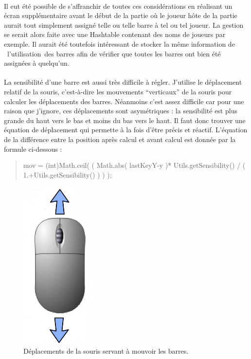\documentclass[a4paper,12pt]{report}
\begin{document}
\paragraph{}
Il eut été possible de s'affranchir de toutes ces considérations en réalisant un écran supplémentaire avant le début de la partie où le joueur hôte de la partie aurait tout simplement assigné telle ou telle barre à tel ou tel joueur. La gestion se serait alors faite avec une Hashtable contenant des noms de joueurs par exemple. Il aurait été toutefois intéressant de stocker la même information de \og l'utilisation \fg  des barres afin de vérifier que toutes les barres ont bien été assignées à quelqu'un.
\paragraph{}
La sensibilité d'une barre est aussi très difficile à régler. J'utilise le déplacement relatif de la souris, c'est-à-dire les mouvements \enquote{verticaux} de la souris pour calculer les déplacements des barres. Néanmoins c'est assez difficile car pour une raison que j'ignore, ces déplacements sont asymétriques : la sensibilité est plus grande du haut vers le bas et moins du bas vers le haut. Il faut donc trouver une équation de déplacement qui permette à la fois d'être précis et réactif. L'équation de la différence entre la position après calcul et avant calcul est donnée par la formule ci-dessous :
\begin{quote}
mov = (int)Math.ceil( ( Math.abs( lastKeyY-y )* Utils.getSensibility() / ( 1.+Utils.getSensibility() ) ) );
\end{quote}
\begin{figure}[H]
	\begin{center}
	\includegraphics[width=4cm]{pictures/mouse.png} 
	\end{center}
	\caption{Déplacements de la souris servant à mouvoir les barres.}
    \end{figure}
\end{document}
